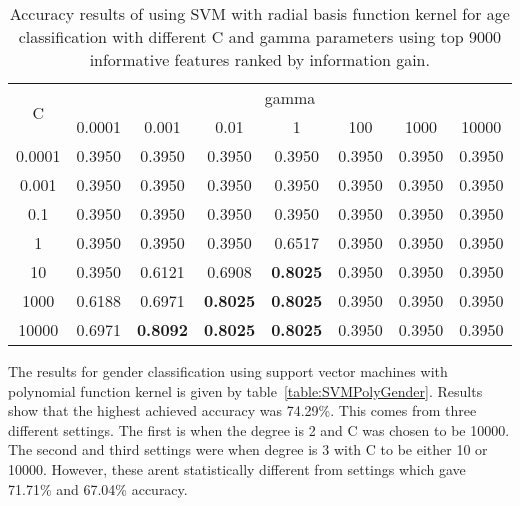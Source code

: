 \documentclass[a4paper]{llncs}
\begin{document}
\begin{table}[!htbp]
\centering
\begin{tabular}{|c|c|c|c|c|c|c|c|}
\hline
\multirow{2}{*}{C} & \multicolumn{7}{c|}{gamma}                                                              \\ \cline{2-8} 
                   & 0.0001 & 0.001           & 0.01            & 1               & 100    & 1000   & 10000  \\ \hline
0.0001             & 0.3950 & 0.3950          & 0.3950          & 0.3950          & 0.3950 & 0.3950 & 0.3950 \\ \hline
0.001              & 0.3950 & 0.3950          & 0.3950          & 0.3950          & 0.3950 & 0.3950 & 0.3950 \\ \hline
0.1                & 0.3950 & 0.3950          & 0.3950          & 0.3950          & 0.3950 & 0.3950 & 0.3950 \\ \hline
1                  & 0.3950 & 0.3950          & 0.3950          & 0.6517          & 0.3950 & 0.3950 & 0.3950 \\ \hline
10                 & 0.3950 & 0.6121          & 0.6908          & \textbf{0.8025} & 0.3950 & 0.3950 & 0.3950 \\ \hline
1000               & 0.6188 & 0.6971          & \textbf{0.8025} & \textbf{0.8025} & 0.3950 & 0.3950 & 0.3950 \\ \hline
10000              & 0.6971 & \textbf{0.8092} & \textbf{0.8025} & \textbf{0.8025} & 0.3950 & 0.3950 & 0.3950 \\ \hline
\end{tabular}
\caption{Accuracy results of using SVM with radial basis function kernel for age classification with different C and gamma parameters using top 9000 informative features ranked by information gain.}
\label{table:SVMRBFAge}
\end{table}

The results for gender classification using support vector machines with polynomial function kernel is given by table~\ref{table:SVMPolyGender}. Results show  that the highest achieved accuracy was 74.29\%. This comes from three different settings. The first is when the degree is 2 and C was chosen to be 10000. The second and third settings were when degree is 3 with C to be either 10 or 10000. However, these arent statistically different from settings which gave 71.71\% and 67.04\% accuracy. 
\end{document}

